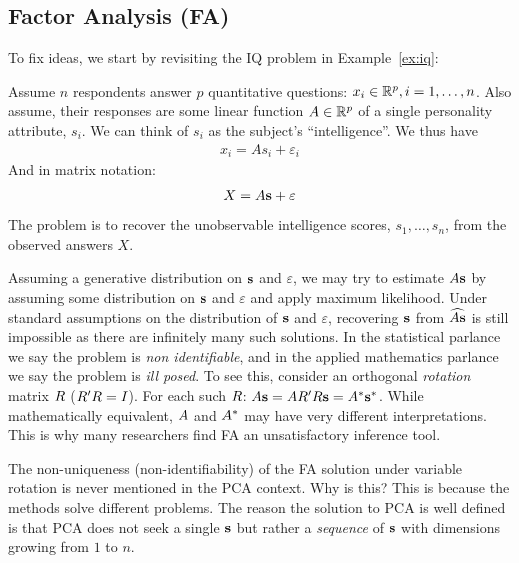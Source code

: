 \documentclass[12pt,a4paper]{article}
\begin{document}
\subsection{Factor Analysis (FA)}

To fix ideas, we start by revisiting the IQ problem in Example~\ref{ex:iq}:
\begin{example}
	
	Assume $n$ respondents answer $p$ quantitative questions: $x_i \in \mathbb{R}^p, i=1,\dots,n$. 
	Also assume, their responses are some linear function $A \in \mathbb{R}^p$ of a single personality attribute, $s_i$. 
	We can think of $s_i$ as the subject's ``intelligence''.
	We thus have 
	\begin{align}
	x_i = A s_i + \varepsilon_i
	\end{align}
	And in matrix notation:
	\begin{align}
	\label{eq:factor}
	X = A \mathbf{s} +\varepsilon
	\end{align}
	The problem is to recover the unobservable intelligence scores, $s_1,\dots,s_n$, from the observed answers $X$.	
\end{example}


Assuming a generative distribution on $\mathbf{s}$ and $\varepsilon$, we may try to estimate $A \mathbf{s}$ by assuming some distribution on $\mathbf{s}$ and $\varepsilon$ and apply maximum likelihood.
Under standard assumptions on the distribution of $\mathbf{s}$ and $\varepsilon$, recovering  $\mathbf{s}$ from $\widehat{A\mathbf{s}}$ is still impossible as there are infinitely many such solutions.
In the statistical parlance we say the problem is \emph{non identifiable}, and in the applied mathematics parlance we say the problem is \emph{ill posed}.
To see this, consider an orthogonal \emph{rotation} matrix $R$ ($R' R=I$). For each such $R$: $ A \mathbf{s}=A R' R \mathbf{s} = A^* \mathbf{s}^*$.
While mathematically equivalent, $A$ and $A^*$ may have very different interpretations. 
This is why many researchers find FA an unsatisfactory inference tool.


\begin{remark}
	The non-uniqueness (non-identifiability) of the FA solution under variable rotation is never mentioned in the PCA context. Why is this?
	This is because the methods solve different problems. 
	The reason the solution to PCA is well defined is that PCA does not seek a single $\mathbf{s}$ but rather a \emph{sequence} of $\mathbf{s}$ with dimensions growing from $1$ to $n$. 
\end{remark}
\end{document}
